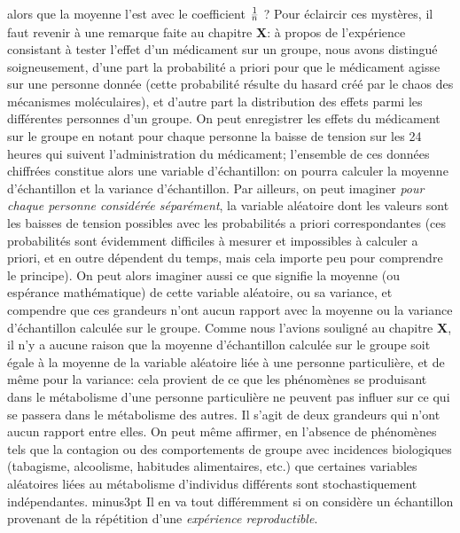 alors que la moyenne l'est avec le coefficient $1\over 
\textdown{n}$ ? 
\medskip 
Pour \'eclaircir ces myst\`eres, il faut revenir \`a une remarque faite
au chapitre {\bf X}: \`a propos de l'exp\'erience consistant \`a tester 
l'effet d'un m\'edicament sur un groupe, nous avons distingu\'e 
soigneusement, d'une part la probabilit\'e a priori pour que le 
m\'edicament agisse sur une personne donn\'ee (cette probabilit\'e
r\'esulte du hasard cr\'e\'e par le chaos des m\'ecanismes 
mol\'eculaires), et d'autre part la distribution des effets parmi les 
diff\'erentes personnes d'un groupe. On peut enregistrer les effets du 
m\'edicament sur le groupe en notant pour chaque personne la baisse de 
tension sur les 24 heures qui suivent l'administration du m\'edicament; 
l'ensemble de ces donn\'ees chiffr\'ees constitue alors une variable 
d'\'echantillon: on pourra calculer la moyenne d'\'echantillon et 
la variance d'\'echantillon. 
\medskip
Par ailleurs, on peut imaginer {\it pour chaque personne consid\'er\'ee
s\'epar\'e\-ment}, la variable al\'eatoire dont les valeurs sont les
baisses de tension possibles avec les probabilit\'es a priori
correspondantes (ces probabilit\'es sont \'evidemment difficiles
\`a mesurer et impossibles \`a calculer a priori, et en outre
d\'ependent du temps, mais cela importe peu pour comprendre
le principe). On peut alors imaginer aussi ce que signifie 
la moyenne (ou esp\'erance math\'ematique) de cette variable 
al\'eatoire, ou sa variance, et compendre que ces grandeurs n'ont aucun 
rapport avec la moyenne ou la variance d'\'echantillon calcul\'ee sur le 
groupe. Comme nous l'avions soulign\'e au chapitre {\bf X}, il n'y a 
aucune raison que la moyenne d'\'echantillon calcul\'ee sur le groupe 
soit \'egale \`a la moyenne de la variable al\'eatoire li\'ee \`a une 
personne particuli\`ere, et de m\^eme pour la variance: cela provient
de ce que les ph\'enom\`enes se produisant dans le m\'etabolisme d'une 
personne particuli\`ere ne peuvent pas influer sur ce qui se passera 
dans le m\'etabolisme des autres. Il s'agit de deux grandeurs qui n'ont
aucun rapport entre elles. On peut m\^eme affirmer, en l'absence de 
ph\'enom\`enes tels que la contagion ou des comportements de groupe 
avec incidences biologiques (tabagisme, alcoolisme, habitudes 
ali\-men\-taires, etc.) que certaines variables al\'eatoires li\'ees
au m\'etabolisme d'individus diff\'erents sont stochastiquement 
ind\'ependantes. 
 minus3pt 
Il en va tout diff\'eremment si on consid\`ere un \'echantillon
provenant de la r\'ep\'etition d'une {\it exp\'erience reproductible}. 
